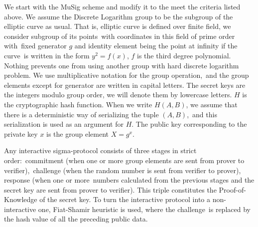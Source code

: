 We start with the MuSig scheme and modify it to the meet the criteria listed above.
We assume the Discrete Logarithm group to be the subgroup of the elliptic curve as usual.
That is, elliptic curve is defined over finite field, we consider subgroup of its points\
with coordinates in this field of prime order with\
fixed generator $g$ and identity element being the point at infinity if the curve\
is written in the form ${y^2=f(x)}$, $f$ is the third degree polynomial.
Nothing prevents one from using another group with hard discrete logarithm problem.
We use multiplicative notation for the group operation,\
and the group elements except for generator are written in capital letters.
The secret keys are the integers modulo group order, we will denote them by lowercase letters.
$H$ is the cryptographic hash function.
When we write ${H(A,B)}$, we assume that there is a deterministic way of serializing the tuple ${(A,B)}$,\
and this serialization is used as an argument for $H$.
The public key corresponding to the private key $x$ is the group element ${X=g^x}$.

Any interactive sigma-protocol consists of three stages in strict order:\
commitment (when one or more group elements are sent from prover to verifier),\
challenge (when the random number is sent from verifier to prover), response (when one or more\
numbers calculated from the previous stages and the secret key are sent from prover to verifier).
This triple constitutes the Proof-of-Knowledge of the secret key.
To turn the interactive protocol into a non-interactive one, Fiat-Shamir heuristic is used, where the challenge\
is replaced by the hash value of all the preceding public data.

